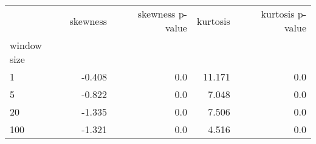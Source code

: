 \begin{tabular}{lrrrr}
\toprule
{} &  skewness &  skewness p-value &  kurtosis &  kurtosis p-value \\
window size &           &                   &           &                   \\
\midrule
1           &    -0.408 &               0.0 &    11.171 &               0.0 \\
5           &    -0.822 &               0.0 &     7.048 &               0.0 \\
20          &    -1.335 &               0.0 &     7.506 &               0.0 \\
100         &    -1.321 &               0.0 &     4.516 &               0.0 \\
\bottomrule
\end{tabular}
